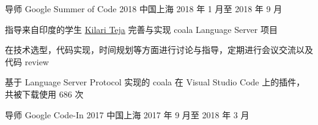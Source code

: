 \begin{cventries}
  \cventry
    {导师} %
    {Google Summer of Code 2018} %
    {中国上海} %
    {2018 年 1 月至 2018 年 9 月} %
    {
      \begin{cvitems}
        \item 指导来自印度的学生 \href{https://github.com/ksdme}{Kilari Teja} 完善与实现 coala Language Server 项目
        \item 在技术选型，代码实现，时间规划等方面进行讨论与指导，定期进行会议交流以及代码 review
        \item 基于 Language Server Protocol 实现的 coala 在 Visual Studio Code 上的插件，共被下载使用 686 次
      \end{cvitems}
    }

  \cventry
    {导师} %
    {Google Code-In 2017} %
    {中国上海} %
    {2017 年 9 月至 2018 年 3 月} %
    {
    }

\end{cventries}
